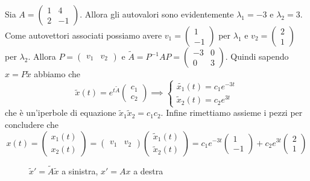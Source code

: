 \begin{example}
    Sia \(A = \begin{pmatrix}
        1 & 4 \\
        2 & -1
    \end{pmatrix}\). Allora gli autovalori sono evidentemente \(\lambda_{1} =
    -3\) e \(\lambda_{2} = 3\). Come autovettori associati possiamo avere
    \(v_{1} = \begin{pmatrix}
        1 \\
        -1
    \end{pmatrix}\) per \(\lambda_{1}\) e \(v_{2} = \begin{pmatrix}
        2 \\
        1
    \end{pmatrix}\) per \(\lambda_{2}\). Allora \(P = \begin{pmatrix}
    v_{1} & v_{2}
    \end{pmatrix}\) e \(\tilde{A} = P^{-1}AP = \begin{pmatrix}
        -3 & 0 \\
        0 & 3
    \end{pmatrix}\). Quindi sapendo \(x = P\tilde{x}\) abbiamo che
    \[
      \tilde{x}{(t)} = e^{t\tilde{A}} \begin{pmatrix}
          c_{1} \\
          c_{2}
      \end{pmatrix} \implies \begin{cases}
      \tilde{x_{1}} {(t)} = c_{1} e^{-3t} \\
      \tilde{x}_2 {(t)} = c_{2} e^{3t}
      \end{cases}
    \]
    che è un'iperbole di equazione \(\tilde{x}_{1} \tilde{x}_{2} = c_{1} c_{2}
    \). Infine rimettiamo assieme i pezzi per concludere che 
    \[
      x{(t)} = \begin{pmatrix}
          x_{1}{(t)} \\
          x_{2}{(t)}
      \end{pmatrix} = \begin{pmatrix}
          v_{1} & v_{2}
      \end{pmatrix} \begin{pmatrix}
          \tilde{x}_1{(t)} \\
            \tilde{x}_2{(t)}
      \end{pmatrix} = c_{1} e^{-3t} \begin{pmatrix}
          1 \\
          -1
          \end{pmatrix} + c_{2} e^{3t} \begin{pmatrix}
          2 \\
          1
      \end{pmatrix}
    \]

\begin{figure}[ht]
    \centering
    \caption{\(\tilde{x}' = \tilde{A} \tilde{x}\) a sinistra, \(x' = Ax\) a
    destra}\label{fig:esempio46}
\end{figure}
\end{example}

